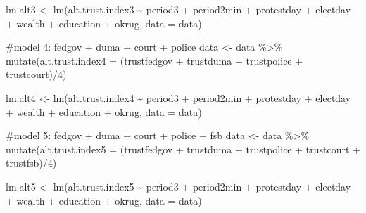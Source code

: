 \documentclass[
  letterpaper,
  DIV=11,
  numbers=noendperiod]{scrartcl}
\newenvironment{Shaded}{\begin{snugshade}}{\end{snugshade}}
\newcommand{\AttributeTok}[1]{\textcolor[rgb]{0.40,0.45,0.13}{#1}}
\newcommand{\CommentTok}[1]{\textcolor[rgb]{0.37,0.37,0.37}{#1}}
\newcommand{\DecValTok}[1]{\textcolor[rgb]{0.68,0.00,0.00}{#1}}
\newcommand{\FunctionTok}[1]{\textcolor[rgb]{0.28,0.35,0.67}{#1}}
\newcommand{\NormalTok}[1]{\textcolor[rgb]{0.00,0.23,0.31}{#1}}
\newcommand{\OtherTok}[1]{\textcolor[rgb]{0.00,0.23,0.31}{#1}}
\newcommand{\SpecialCharTok}[1]{\textcolor[rgb]{0.37,0.37,0.37}{#1}}
\begin{document}
\begin{Shaded}
\begin{Highlighting}[]
\NormalTok{lm.alt3 }\OtherTok{\textless{}{-}} \FunctionTok{lm}\NormalTok{(alt.trust.index3 }\SpecialCharTok{\textasciitilde{}}\NormalTok{ period3 }\SpecialCharTok{+}\NormalTok{ period2min }\SpecialCharTok{+}\NormalTok{ protestday }\SpecialCharTok{+}\NormalTok{ electday }\SpecialCharTok{+}
\NormalTok{                  wealth }\SpecialCharTok{+}\NormalTok{ education }\SpecialCharTok{+}\NormalTok{ okrug, }\AttributeTok{data =}\NormalTok{ data)}

\CommentTok{\#model 4: fedgov + duma + court + police}
\NormalTok{data }\OtherTok{\textless{}{-}}\NormalTok{ data }\SpecialCharTok{\%\textgreater{}\%} 
  \FunctionTok{mutate}\NormalTok{(}\AttributeTok{alt.trust.index4 =}\NormalTok{ (trustfedgov }\SpecialCharTok{+}\NormalTok{ trustduma }\SpecialCharTok{+}\NormalTok{ trustpolice }\SpecialCharTok{+}\NormalTok{ trustcourt)}\SpecialCharTok{/}\DecValTok{4}\NormalTok{)}

\NormalTok{lm.alt4 }\OtherTok{\textless{}{-}} \FunctionTok{lm}\NormalTok{(alt.trust.index4 }\SpecialCharTok{\textasciitilde{}}\NormalTok{ period3 }\SpecialCharTok{+}\NormalTok{ period2min }\SpecialCharTok{+}\NormalTok{ protestday }\SpecialCharTok{+}\NormalTok{ electday }\SpecialCharTok{+}
\NormalTok{                  wealth }\SpecialCharTok{+}\NormalTok{ education }\SpecialCharTok{+}\NormalTok{ okrug, }\AttributeTok{data =}\NormalTok{ data)}

\CommentTok{\#model 5: fedgov + duma + court + police + fsb}
\NormalTok{data }\OtherTok{\textless{}{-}}\NormalTok{ data }\SpecialCharTok{\%\textgreater{}\%} 
  \FunctionTok{mutate}\NormalTok{(}\AttributeTok{alt.trust.index5 =}\NormalTok{ (trustfedgov }\SpecialCharTok{+}\NormalTok{ trustduma }\SpecialCharTok{+}\NormalTok{ trustpolice }\SpecialCharTok{+}\NormalTok{ trustcourt }\SpecialCharTok{+}
\NormalTok{                               trustfsb)}\SpecialCharTok{/}\DecValTok{4}\NormalTok{)}

\NormalTok{lm.alt5 }\OtherTok{\textless{}{-}} \FunctionTok{lm}\NormalTok{(alt.trust.index5 }\SpecialCharTok{\textasciitilde{}}\NormalTok{ period3 }\SpecialCharTok{+}\NormalTok{ period2min }\SpecialCharTok{+}\NormalTok{ protestday }\SpecialCharTok{+}\NormalTok{ electday }\SpecialCharTok{+}
\NormalTok{                  wealth }\SpecialCharTok{+}\NormalTok{ education }\SpecialCharTok{+}\NormalTok{ okrug, }\AttributeTok{data =}\NormalTok{ data)}


\end{Highlighting}
\end{Shaded}
\end{document}
